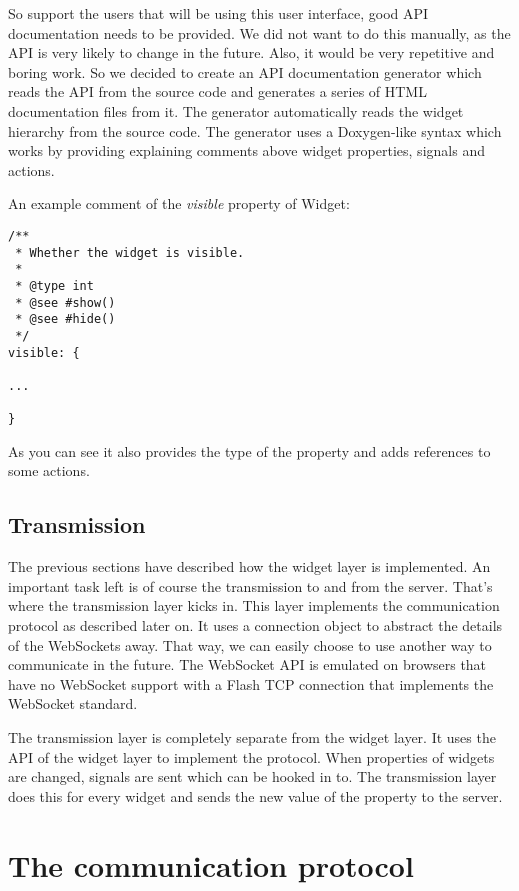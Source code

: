 \documentclass[11pt,a4paper]{article}
\begin{document}
So support the users that will be using this user interface, good API documentation needs to be provided.
We did not want to do this manually, as the API is very likely to change in the future.
Also, it would be very repetitive and boring work.
So we decided to create an API documentation generator which reads the API from the source code and generates a series of HTML documentation files from it.
The generator automatically reads the widget hierarchy from the source code.
The generator uses a Doxygen-like syntax which works by providing explaining comments above widget properties, signals and actions.

\newpage
An example comment of the \textit{visible} property of Widget:
\begin{verbatim}
/**
 * Whether the widget is visible.
 *
 * @type int
 * @see #show()
 * @see #hide()
 */
visible: {

...

}
\end{verbatim}
As you can see it also provides the type of the property and adds references to some actions.

\subsection{Transmission}

The previous sections have described how the widget layer is implemented.
An important task left is of course the transmission to and from the server.
That's where the transmission layer kicks in.
This layer implements the communication protocol as described later on.
It uses a connection object to abstract the details of the WebSockets away.
That way, we can easily choose to use another way to communicate in the future.
The WebSocket API is emulated on browsers that have no WebSocket support with a Flash TCP connection that implements the WebSocket standard.

The transmission layer is completely separate from the widget layer.
It uses the API of the widget layer to implement the protocol.
When properties of widgets are changed, signals are sent which can be hooked in to.
The transmission layer does this for every widget and sends the new value of the property to the server.

\newpage
\section{The communication protocol}
\end{document}
